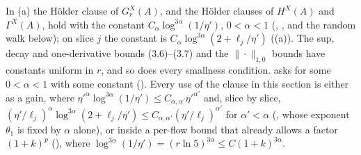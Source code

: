 \begin{remark}\label{rot:hyb:rem:Hol}
In (a) the H\"older clause \cite[(3.8)]{K1} of $G^X_r(A)$, and the H\"older clauses of $H^X(A)$ and $\Gamma^X(A)$, hold with the constant $C_\alpha\log^{3\alpha}(1/\eta')$, $0<\alpha<1$ (, , and the random walk below); on slice $j$ the constant is $C_\alpha\log^{3\alpha}(2+\ell_j/\eta')$ ((a)). The sup, decay and one-derivative bounds (3.6)--(3.7) and the $\|\cdot\|_{1,0}$ bounds have constants uniform in $r$, and so does every smallness condition. \cite[(3.8)]{K1} asks for some $0<\alpha<1$ with some constant (\cite[p.~656]{K1}). Every use of the clause in this section is either as a gain, where $\eta'^\alpha\log^{3\alpha}(1/\eta')\le C_{\alpha,\alpha'}\eta'^{\alpha'}$ and, slice by slice, $(\eta'/\ell_j)^\alpha\log^{3\alpha}(2+\ell_j/\eta')\le C_{\alpha,\alpha'}(\eta'/\ell_j)^{\alpha'}$ for $\alpha'<\alpha$ (, whose exponent $\theta_1$ is fixed by $\alpha$ alone), or inside a per-flow bound that already allows a factor $(1+k)^p$ (), where $\log^{3\alpha}(1/\eta')=(r\ln5)^{3\alpha}\le C(1+k)^{3\alpha}$.
\end{remark}
